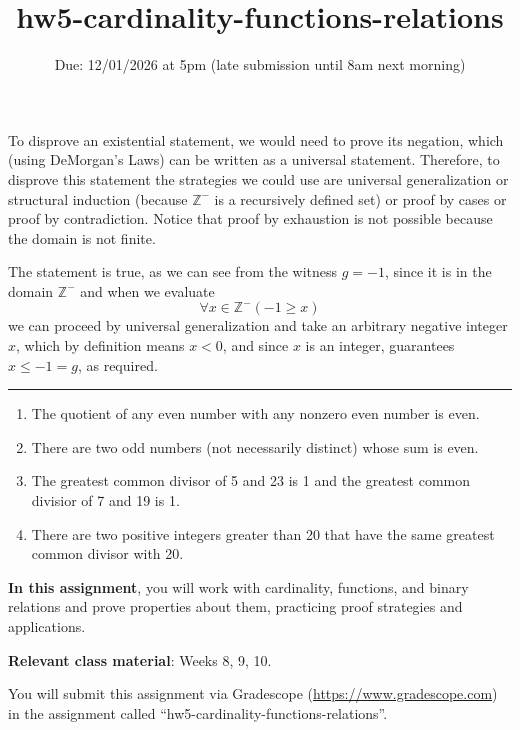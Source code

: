 \begin{enumerate}[labelindent=0pt, leftmargin=0pt]
    To disprove an existential statement, we would need to prove its negation, which (using DeMorgan's Laws) can be 
    written as a universal statement. Therefore, to disprove this statement the strategies we could use are 
    universal generalization or structural induction (because $\mathbb{Z}^{-}$ is a recursively defined set) or 
    proof by cases or proof by contradiction. Notice that proof by exhaustion is not possible because the domain is not finite.

    The statement is true, as we can see from the witness $g = -1$, since it is in the domain $\mathbb{Z}^{-}$ and when we evaluate
    \[
        \forall x \in \mathbb{Z}^{-} ( -1 \geq x)
    \]
    we can proceed by universal generalization and take an arbitrary negative integer $x$, which by definition means $x < 0$, 
    and since $x$ is an integer, guarantees $x \leq -1 = g$, as required.
    \rule{0.5\textwidth}{.4pt}

        \begin{enumerate}
            \item The quotient of any even number with any nonzero even number is even.
            \item There are two odd numbers (not necessarily distinct) whose sum is even.
            \item The greatest common divisor of 5 and 23 is 1 and the greatest common divisior of 7 and 19 is 1.
            \item There are two positive integers greater than 20 that have the same greatest common divisor with 20.
        \end{enumerate}
\end{enumerate}

\newpage


\title{hw5-cardinality-functions-relations}
\date{Due: 12/01/2026 at 5pm (late submission until 8am next morning)}

\maketitle
\thispagestyle{fancy}


{\bf In this assignment},  you will work with cardinality, functions, and binary relations and prove 
properties about them, practicing proof strategies and applications.


{\bf Relevant class material}: Weeks 8, 9, 10.

You will submit this assignment via Gradescope
(\href{https://www.gradescope.com}{https://www.gradescope.com}) 
in the assignment called ``hw5-cardinality-functions-relations''.


